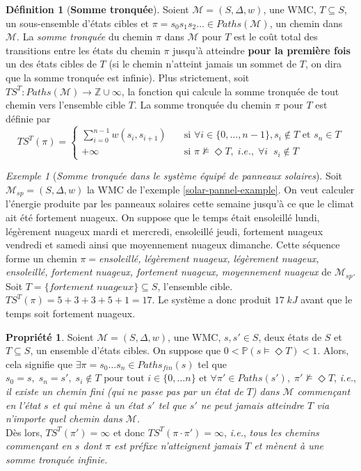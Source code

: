 \documentclass[12pt,a4paper]{report}
\theoremstyle{definition}%
\newtheorem{definition}{Définition}[chapter]
\newtheorem{propriete}{Propriété}[chapter]
\theoremstyle{remark}
\newtheorem{example}{Exemple}[chapter]
\newcommand{\ie}{\textit{i.e.}, }
\newcommand{\pr}{\mathbb{P}}
\begin{document}
\begin{definition}[\textbf{Somme tronquée}]
	Soient $\mathcal{M} = (S, \Delta, w)$, une WMC, $T \subseteq S$, un sous-ensemble d'états cibles et $\pi = s_0s_1s_2 \dots \in Paths(\mathcal{M})$, un chemin dans $\mathcal{M}$. La \textit{somme tronquée} du chemin $\pi$ dans $\mathcal{M}$ pour $T$ est le coût total des transitions entre les états du chemin $\pi$ jusqu'à atteindre \textbf{pour la première fois} un des états cibles de $T$ (si le chemin n'atteint jamais un sommet de $T$, on dira que la somme tronquée est infinie).
	Plus strictement,
	soit $TS^T : Paths(\mathcal{M}) \rightarrow \mathbb{Z} \cup \infty$, la fonction qui calcule la somme tronquée de tout chemin vers l'ensemble cible $T$. La somme tronquée du chemin $\pi$ pour $T$ est définie par 
	\[
		TS^T(\pi) =
		\begin{cases}
			\sum_{i = 0}^{n-1} w(s_i, s_{i+1}) & \quad \text{si } \forall i \in \{0, \dots, n - 1\}, s_i \notin T \text{ et } s_n \in T \\
			+\infty & \quad \text{si } \pi \not \models \Diamond T,\; \ie \; \forall i \;\; s_i \notin T
		\end{cases}
	\]
\end{definition}

\begin{example}[\textit{Somme tronquée dans le système équipé de panneaux solaires}]
	Soit $\mathcal{M}_{sp}=(S, \Delta, w)$ la WMC de l'exemple \ref{solar-pannel-example}. On veut calculer l'énergie produite par les panneaux solaires cette semaine jusqu'à ce que le climat ait été fortement nuageux. On suppose que le temps était ensoleillé lundi, légèrement nuageux mardi et mercredi, ensoleillé jeudi, fortement nuageux vendredi et samedi ainsi que moyennement nuageux dimanche. Cette séquence forme un chemin $\pi = $\textit{ensoleillé, légèrement nuageux, légèrement nuageux, ensoleillé, fortement nuageux, fortement nuageux, moyennement nuageux} de $\mathcal{M}_{sp}$. Soit $T = \{\textit{fortement nuageux}\} \subseteq S$, l'ensemble cible. $TS^T(\pi) = 5 + 3 + 3 + 5 + 1 = 17$. Le système a donc produit $17\; kJ$ avant que le temps soit fortement nuageux. 
\end{example}

\begin{propriete}\label{prop-ts}
	Soient $\mathcal{M} = (S, \Delta, w)$, une WMC, $s, s' \in S$, deux états de $S$ et $T \subseteq S$, un ensemble d'états cibles. On suppose que $0 < \pr(s \models \Diamond T) < 1$. Alors, cela signifie que $\exists \pi = s_0 \dots s_n \in Paths_{fin}(s)$ tel que $s_0 = s,\; s_n = s',\; s_i \notin T \text{ pour tout } i \in \{0, \dots n \} \text{ et } \forall \pi' \in Paths(s'), \; \pi' \not \models \Diamond T$, \ie \textit{il existe un chemin fini (qui ne passe pas par un état de $T$) dans $\mathcal{M}$ commençant en l'état $s$ et qui mène à un état $s'$ tel que $s'$ ne peut jamais atteindre $T$ via n'importe quel chemin dans $\mathcal{M}$.}\\ Dès lors, $TS^T(\pi') = \infty$ et donc $TS^T(\pi \cdot \pi') = \infty$, \ie \textit{tous les chemins commençant en $s$ dont $\pi$ est préfixe n'atteignent jamais $T$ et mènent à une somme tronquée infinie.}
\end{propriete}
\end{document}
